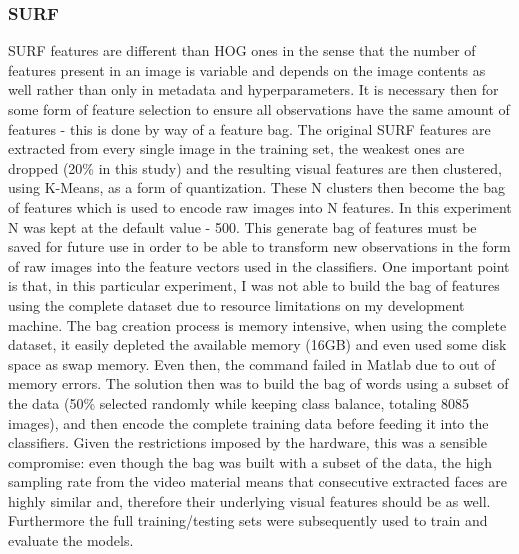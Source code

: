 \documentclass[11pt]{article}
\begin{document}
        \subsubsection*{SURF}
            SURF features are different than HOG ones in the sense that the number of features present in an image is variable and depends on the image contents as well rather than only in metadata and hyperparameters. It is necessary then for some form of feature selection to ensure all observations have the same amount of features - this is done by way of a feature bag. The original SURF features are extracted from every single image in the training set, the weakest ones are dropped (20\% in this study) and the resulting visual features are then clustered, using K-Means, as a form of quantization. These N clusters then become the bag of features which is used to encode raw images into N features. In this experiment N was kept at the default value - 500. This generate bag of features must be saved for future use in order to be able to transform new observations in the form of raw images into the feature vectors used in the classifiers.
            One important point is that, in this particular experiment, I was not able to build the bag of features using the complete dataset due to resource limitations on my development machine. The bag creation process is memory intensive, when using the complete dataset, it easily depleted the available memory (16GB) and even used some disk space as swap memory. Even then, the command failed in Matlab due to out of memory errors. The solution then was to build the bag of words using a subset of the data (50\% selected randomly while keeping class balance, totaling 8085 images), and then encode the complete training data before feeding it into the classifiers. Given the restrictions imposed by the hardware, this was a sensible compromise: even though the bag was built with a subset of the data, the high sampling rate from the video material means that consecutive extracted faces are highly similar and, therefore their underlying visual features should be as well. Furthermore the full training/testing sets were subsequently used to train and evaluate the models.
\end{document}

